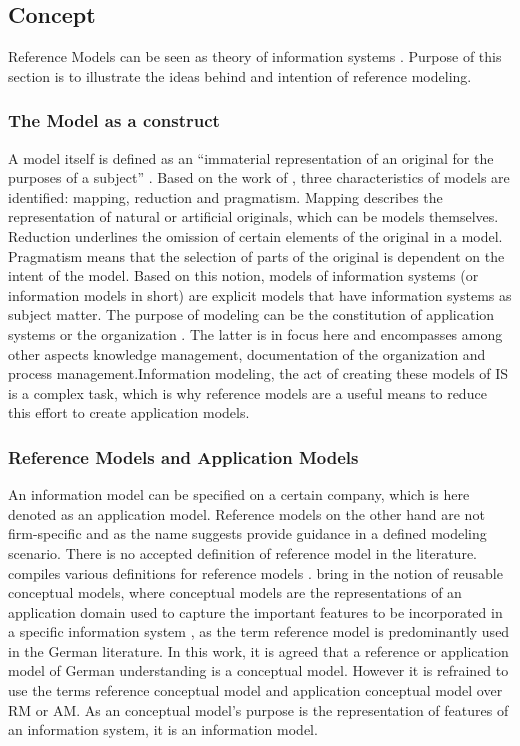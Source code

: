		\subsection{Concept}
		
		Reference Models can be seen as theory of information systems \citep{Schutte1998}. Purpose of this section is to illustrate the ideas behind and intention of reference modeling.  
		
		\subsubsection{The Model as a construct}
		
		
		A model itself is defined as an \enquote{immaterial representation of an original for the purposes of a subject} \citep[]{BeckerGOM2012}. Based on the work of \cite{Stachowiak1973}, three characteristics of models are identified: mapping, reduction and pragmatism. Mapping describes the representation of natural or artificial originals, which can be models themselves. Reduction underlines the omission of certain elements of the original in a model. Pragmatism means that the selection of parts of the original is dependent on the intent of the model. Based on this notion, models of information systems (or information models in short) are explicit models that have information systems as subject matter. The purpose of modeling can be the constitution of application systems or the organization \citep[]{Rosemann2012proc}. The latter is in focus here and encompasses among other aspects knowledge management, documentation of the organization and process management.Information modeling, the act of creating these models of \acrshort{IS} is a complex task, which is why reference models are a useful means to reduce this effort \citep{Becker2007} to create application models.
		 
			\subsubsection{Reference Models and Application Models}
			An information model can be specified on a certain company, which is here denoted as an application model. Reference models on the other hand are not firm-specific and as the name suggests provide guidance in a defined modeling scenario. There is no accepted definition of reference model in the literature. \citeauthor{thomas2006a} compiles various definitions for reference models \citep{thomas2006a}. \citeauthor{vom2006reusable} bring in the notion of reusable conceptual models, where conceptual models are the representations of an application domain used to capture the important features to be incorporated in a specific information system \citep[]{vom2006reusable}, as the term reference model is predominantly used in the German literature. In this work, it is agreed that a reference or application model of German understanding is a conceptual model. However it is refrained to use the terms reference conceptual model and application conceptual model over \acrfull{RM} or \acrfull{AM}. As an conceptual model's purpose is the representation of features of an information system, it is an information model. 
			
